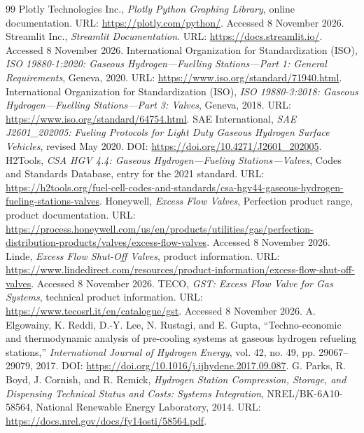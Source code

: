 \documentclass[12pt,a4paper,twoside,openright]{report}
\begin{document}
\begin{thebibliography}{99}
     Plotly Technologies Inc., \textit{Plotly Python Graphing Library}, online documentation. URL: \url{https://plotly.com/python/}. Accessed 8 November 2026.
     Streamlit Inc., \textit{Streamlit Documentation}. URL: \url{https://docs.streamlit.io/}. Accessed 8 November 2026.
     International Organization for Standardization (ISO), \textit{ISO 19880-1:2020: Gaseous Hydrogen---Fuelling Stations---Part 1: General Requirements}, Geneva, 2020. URL: \url{https://www.iso.org/standard/71940.html}.
     International Organization for Standardization (ISO), \textit{ISO 19880-3:2018: Gaseous Hydrogen---Fuelling Stations---Part 3: Valves}, Geneva, 2018. URL: \url{https://www.iso.org/standard/64754.html}.
     SAE International, \textit{SAE J2601\_202005: Fueling Protocols for Light Duty Gaseous Hydrogen Surface Vehicles}, revised May 2020. DOI: \url{https://doi.org/10.4271/J2601_202005}.
     H2Tools, \textit{CSA HGV 4.4: Gaseous Hydrogen---Fueling Stations---Valves}, Codes and Standards Database, entry for the 2021 standard. URL: \url{https://h2tools.org/fuel-cell-codes-and-standards/csa-hgv44-gaseous-hydrogen-fueling-stations-valves}.
     Honeywell, \textit{Excess Flow Valves}, Perfection product range, product documentation. URL: \url{https://process.honeywell.com/us/en/products/utilities/gas/perfection-distribution-products/valves/excess-flow-valves}. Accessed 8 November 2026.
     Linde, \textit{Excess Flow Shut-Off Valves}, product information. URL: \url{https://www.lindedirect.com/resources/product-information/excess-flow-shut-off-valves}. Accessed 8 November 2026.
     TECO, \textit{GST: Excess Flow Valve for Gas Systems}, technical product information. URL: \url{https://www.tecosrl.it/en/catalogue/gst}. Accessed 8 November 2026.
     A. Elgowainy, K. Reddi, D.-Y. Lee, N. Rustagi, and E. Gupta, ``Techno-economic and thermodynamic analysis of pre-cooling systems at gaseous hydrogen refueling stations,'' \textit{International Journal of Hydrogen Energy}, vol. 42, no. 49, pp. 29067--29079, 2017. DOI: \url{https://doi.org/10.1016/j.ijhydene.2017.09.087}.
     G. Parks, R. Boyd, J. Cornish, and R. Remick, \textit{Hydrogen Station Compression, Storage, and Dispensing Technical Status and Costs: Systems Integration}, NREL/BK-6A10-58564, National Renewable Energy Laboratory, 2014. URL: \url{https://docs.nrel.gov/docs/fy14osti/58564.pdf}.

\end{thebibliography}
\end{document}
